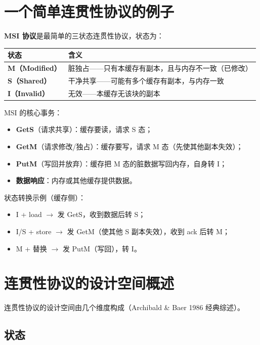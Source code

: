 \section{一个简单连贯性协议的例子}

\textbf{MSI 协议}是最简单的三状态连贯性协议，状态为：

\begin{center}
\begin{tabular}{ll}
\toprule
状态 & 含义 \\
\midrule
\textbf{M（Modified）} & 脏独占——只有本缓存有副本，且与内存不一致（已修改） \\
\textbf{S（Shared）} & 干净共享——可能有多个缓存有副本，与内存一致 \\
\textbf{I（Invalid）} & 无效——本缓存无该块的副本 \\
\bottomrule
\end{tabular}
\end{center}


MSI 的核心事务：

\begin{itemize}
\item \textbf{GetS}（请求共享）：缓存要读，请求 S 态；
\item \textbf{GetM}（请求修改/独占）：缓存要写，请求 M 态（先使其他副本失效）；
\item \textbf{PutM}（写回并放弃）：缓存把 M 态的脏数据写回内存，自身转 I；
\item \textbf{数据响应}：内存或其他缓存提供数据。
\end{itemize}


状态转换示例（缓存侧）：

\begin{itemize}
\item I + load $\rightarrow$ 发 GetS，收到数据后转 S；
\item I/S + store $\rightarrow$ 发 GetM（使其他 S 副本失效），收到 ack 后转 M；
\item M + 替换 $\rightarrow$ 发 PutM（写回），转 I。
\end{itemize}


\section{连贯性协议的设计空间概述}

连贯性协议的设计空间由几个维度构成（Archibald \& Baer 1986 经典综述）。

\subsection{状态}


